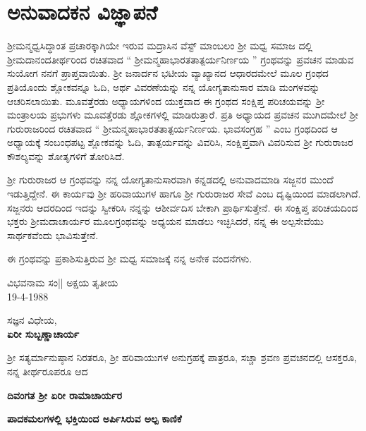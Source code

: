 
\chapter*{ಅನುವಾದಕನ ವಿಜ್ಞಾಪನೆ}

 ಶ‍್ರೀಮನ್ಮಧ್ವಸಿದ್ಧಾಂತ ಪ್ರಚಾರಕ್ಕಾಗಿಯೇ ಇರುವ ಮದ್ರಾಸಿನ ವೆಸ್ಟ್ ಮಾಂಬಲಂ ಶ‍್ರೀ ಮಧ್ವ ಸಮಾಜ ದಲ್ಲಿ ಶ‍್ರೀಮದಾನಂದತೀರ್ಥರಿಂದ ರಚಿತವಾದ “ ಶ‍್ರೀಮನ್ಮಹಾಭಾರತತಾತ್ಪರ್ಯನಿರ್ಣಯ ” ಗ್ರಂಥವನ್ನು ಪ್ರವಚನ ಮಾಡುವ ಸುಯೋಗ ನನಗೆ ಪ್ರಾಪ್ತವಾಯಿತು. ಶ‍್ರೀ ಜನಾರ್ದನ ಭಟೀಯ ವ್ಯಾಖ್ಯಾನದ ಆಧಾರದಮೇಲೆ ಮೂಲ ಗ್ರಂಥದ ಪ್ರತಿಯೊಂದು ಶ್ಲೋಕವನ್ನೂ ಓದಿ, ಅರ್ಥ ವಿವರಣೆಯನ್ನು ನನ್ನ ಯೋಗ್ಯತಾನುಸಾರ ಮಾಡಿ ಮಂಗಳವನ್ನು ಆಚರಿಸಲಾಯಿತು. ಮೂವತ್ತೆರಡು ಅಧ್ಯಾಯಗಳಿಂದ ಯುಕ್ತವಾದ ಈ ಗ್ರಂಥದ ಸಂಕ್ಷಿಪ್ತ ಪರಿಚಯವನ್ನು ಶ‍್ರೀ ಮಂತ್ರಾಲಯ ಪ್ರಭುಗಳು ಮೂವತ್ತೆರಡು ಶ್ಲೋಕಗಳಲ್ಲಿ ಮಾಡಿರುತ್ತಾರೆ. ಪ್ರತಿ ಅಧ್ಯಾಯದ ಪ್ರವಚನ ಮುಗಿದಮೇಲೆ ಶ‍್ರೀ ಗುರುರಾಜರಿಂದ ರಚಿತವಾದ “ ಶ‍್ರೀಮನ್ಮಹಾಭಾರತತಾತ್ಪರ್ಯನಿರ್ಣಯ. ಭಾವಸಂಗ್ರಹ ” ಎಂಬ ಗ್ರಂಥದಿಂದ ಆ ಅಧ್ಯಾಯಕ್ಕೆ ಸಂಬಂಧಪಟ್ಟ ಶ್ಲೋಕವನ್ನು ಓದಿ, ತಾತ್ಪರ್ಯವನ್ನು ವಿವರಿಸಿ, ಸಂಕ್ಷಿಪ್ತವಾಗಿ ವಿವರಿಸುವ ಶ‍್ರೀ ಗುರುರಾಜರ ಕೌಶಲ್ಯವನ್ನು ಶೋತೃಗಳಿಗೆ ತೋರಿಸಿದೆ.

ಶ‍್ರೀ ಗುರುರಾಜರ ಆ ಗ್ರಂಥವನ್ನು ನನ್ನ ಯೋಗ್ಯತಾನುಸಾರವಾಗಿ ಕನ್ನಡದಲ್ಲಿ ಅನುವಾದಮಾಡಿ ಸಜ್ಜನರ ಮುಂದೆ ಇಡುತ್ತಿದ್ದೇನೆ. ಈ ಕಾರ್ಯವು ಶ‍್ರೀ ಹರಿವಾಯುಗಳ ಹಾಗೂ ಶ‍್ರೀ ಗುರುರಾಜರ ಸೇವೆ ಎಂಬ ದೃಷ್ಟಿಯಿಂದ ಮಾಡಲಾಗಿದೆ. ಸಜ್ಜನರು ಆದರದಿಂದ ಇದನ್ನು ಸ್ವೀಕರಿಸಿ ನನ್ನನ್ನು ಆಶೀರ್ವದಿಸ ಬೇಕಾಗಿ ಪ್ರಾರ್ಥಿಸುತ್ತೇನೆ. ಈ ಸಂಕ್ಷಿಪ್ತ ಪರಿಚಯದಿಂದ ಭಕ್ತರು ಶ‍್ರೀಮದಾಚಾರ್ಯರ ಮೂಲಗ್ರಂಥವನ್ನು ಅಧ್ಯಯನ ಮಾಡಲು ಇಚ್ಛಿಸಿದರೆ, ನನ್ನ ಈ ಅಲ್ಪಸೇವೆಯು ಸಾರ್ಥಕವೆಂದು ಭಾವಿಸುತ್ತೇನೆ.

ಈ ಗ್ರಂಥವನ್ನು ಪ್ರಕಾಶಿಸುತ್ತಿರುವ ಶ‍್ರೀ ಮಧ್ವ ಸಮಾಜಕ್ಕೆ ನನ್ನ ಅನೇಕ ವಂದನೆಗಳು.

\begin{flushleft}
ವಿಭವನಾಮ ಸಂ|| ಅಕ್ಷಯ ತೃತೀಯ \\ 19-4-1988
\end{flushleft}

\begin{flushright}
ಸಜ್ಞನ ವಿಧೇಯ, \\\textbf{ಏರೀ ಸುಬ್ಬಣ್ಣಾಚಾರ್ಯ}
\end{flushright}

\begin{center}
ಶ‍್ರೀ ಸತ್ಯರ್ಮಾನುಷ್ಠಾನ ನಿರತರೂ, ಶ‍್ರೀ ಹರಿವಾಯುಗಳ ಅನುಗ್ರಹಕ್ಕೆ ಪಾತ್ರರೂ, ಸಚ್ಚಾ ಶ್ರವಣ ಪ್ರವಚನದಲ್ಲಿ ಆಸಕ್ತರೂ, ನನ್ನ ತೀರ್ಥರೂಪರೂ ಆದ
\end{center}

\begin{center}
\textbf{ದಿವಂಗತ ಶ‍್ರೀ ಏರೀ ರಾಮಾಚಾರ್ಯರ}
\end{center}

\begin{center}
\textbf{ಪಾದಕಮಲಗಳಲ್ಲಿ ಭಕ್ತಿಯಿಂದ ಅರ್ಪಿಸಿರುವ ಅಲ್ಪ ಕಾಣಿಕೆ}
\end{center}

